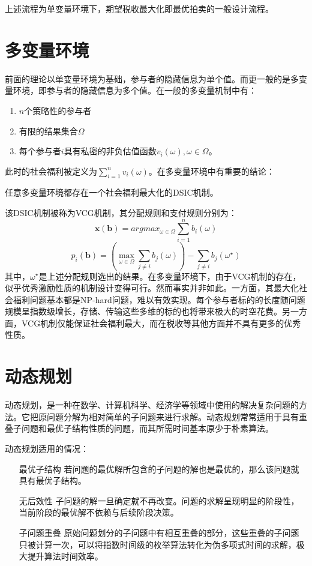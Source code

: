 \documentclass[promaster]{thesis-uestc}
\begin{document}
上述流程为单变量环境下，期望税收最大化即最优拍卖的一般设计流程。
\section{多变量环境}
前面的理论以单变量环境为基础，参与者的隐藏信息为单个值。而更一般的是多变量环境，即参与者的隐藏信息为多个值。在一般的多变量机制中有：

\begin{enumerate}
    \item $n$个策略性的参与者
    \item 有限的结果集合$\Omega$
    \item 每个参与者$i$具有私密的非负估值函数$v_i(\omega),\omega \in \Omega$。
\end{enumerate}

此时的社会福利被定义为$\sum_{i=1}^{n}{v_i(\omega)}$。在多变量环境中有重要的结论：
\begin{theorem}
    任意多变量环境都存在一个社会福利最大化的DSIC机制。
\end{theorem}
该DSIC机制被称为VCG机制，其分配规则和支付规则分别为：
\begin{equation}
 \mathbf{x}(\mathbf{b})=argmax_{\omega \in \Omega}\sum_{i=1}^{n}{b_i(\omega)}
\end{equation}
\begin{equation}
p_i(\mathbf{b})=\left(\max_{\omega\in\Omega}\sum_{j\neq i}{b_j(\omega)}\right)-\sum_{j\neq i}b_j(\omega^\star)    
\end{equation}
其中，$\omega^\star$是上述分配规则选出的结果。在多变量环境下，由于VCG机制的存在，似乎优秀激励性质的机制设计变得可行。然而事实并非如此。一方面，其最大化社会福利问题基本都是NP-hard问题，难以有效实现。每个参与者标的的长度随问题规模呈指数级增长，存储、传输这些多维的标的也将带来极大的时空花费。另一方面，VCG机制仅能保证社会福利最大，而在税收等其他方面并不具有更多的优秀性质。
\section{动态规划}
动态规划，是一种在数学、计算机科学、经济学等领域中使用的解决复杂问题的方法。它把原问题分解为相对简单的子问题来进行求解。动态规划常常适用于具有重叠子问题和最优子结构性质的问题，而其所需时间基本原少于朴素算法。

动态规划适用的情况：

\begin{itemize}
    \item[最优子结构]若问题的最优解所包含的子问题的解也是最优的，那么该问题就具有最优子结构。
    \item[无后效性]子问题的解一旦确定就不再改变。问题的求解呈现明显的阶段性，当前阶段的最优解不依赖与后续阶段决策。
    \item[子问题重叠]原始问题划分的子问题中有相互重叠的部分，这些重叠的子问题只被计算一次，可以将指数时间级的枚举算法转化为伪多项式时间的求解，极大提升算法时间效率。
\end{itemize}
\end{document}
